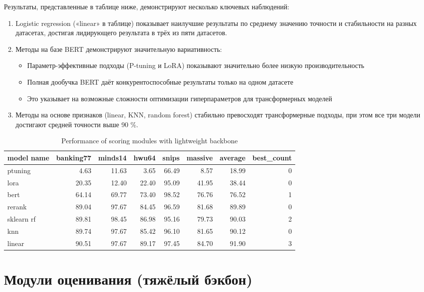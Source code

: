 \documentclass[14pt,a4paper,oneside,openany]{extbook}
\begin{document}
Результаты, представленные в таблице ниже, демонстрируют несколько ключевых наблюдений:

\begin{enumerate}
\item Logistic regression («linear» в таблице) показывает наилучшие результаты по среднему значению точности и стабильности на разных датасетах, достигая лидирующего результата в трёх из пяти датасетов.
\item Методы на базе BERT демонстрируют значительную вариативность:
\begin{itemize}
\item Параметр-эффективные подходы (P-tuning и LoRA) показывают значительно более низкую производительность
\item Полная дообучка BERT даёт конкурентоспособные результаты только на одном датасете
\item Это указывает на возможные сложности оптимизации гиперпараметров для трансформерных моделей
\end{itemize}
\item Методы на основе признаков (linear, KNN, random forest) стабильно превосходят трансформерные подходы, при этом все три модели достигают средней точности выше 90 \%.
\end{enumerate}

\begin{table}[htbp]
\caption{\label{tab:scoring_light}Performance of scoring modules with lightweight backbone}
\centering
\begin{tabular}{lrrrrrrr}
model name & banking77 & minds14 & hwu64 & snips & massive & average & best\_count\\
\hline
ptuning & 4.63 & 11.63 & 3.65 & 66.49 & 8.57 & 18.99 & 0\\
lora & 20.35 & 12.40 & 22.40 & 95.09 & 41.95 & 38.44 & 0\\
bert & 64.14 & 69.77 & 73.40 & 98.52 & 76.76 & 76.52 & 1\\
rerank & 89.04 & 97.67 & 84.45 & 96.59 & 81.68 & 89.89 & 0\\
sklearn rf & 89.81 & 98.45 & 86.98 & 95.16 & 79.73 & 90.03 & 2\\
knn & 89.74 & 97.67 & 85.42 & 96.10 & 81.65 & 90.12 & 0\\
linear & 90.51 & 97.67 & 89.17 & 97.45 & 84.70 & 91.90 & 3\\
\end{tabular}
\end{table}
\section{Модули оценивания (тяжёлый бэкбон)}
\label{sec:orgb498407}
\end{document}
